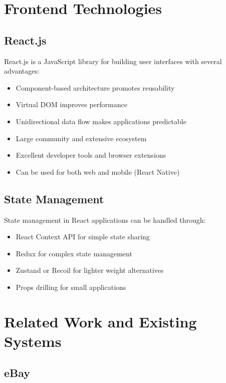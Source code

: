 \section{Frontend Technologies}

\subsection{React.js}

React.js is a JavaScript library for building user interfaces with several advantages:

\begin{itemize}
    \item Component-based architecture promotes reusability
    \item Virtual DOM improves performance
    \item Unidirectional data flow makes applications predictable
    \item Large community and extensive ecosystem
    \item Excellent developer tools and browser extensions
    \item Can be used for both web and mobile (React Native)
\end{itemize}

\subsection{State Management}

State management in React applications can be handled through:

\begin{itemize}
    \item React Context API for simple state sharing
    \item Redux for complex state management
    \item Zustand or Recoil for lighter weight alternatives
    \item Props drilling for small applications
\end{itemize}

\section{Related Work and Existing Systems}

\subsection{eBay}

